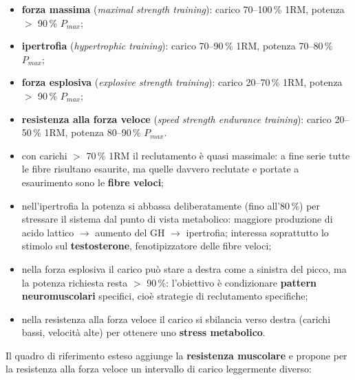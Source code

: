 \begin{itemize}
  \item \textbf{forza massima} (\textit{maximal strength training}): carico 70--100\,\% 1RM, potenza
    $>$ 90\,\% $P_{max}$;
  \item \textbf{ipertrofia} (\textit{hypertrophic training}): carico 70--90\,\% 1RM, potenza
    70--80\,\% $P_{max}$;
  \item \textbf{forza esplosiva} (\textit{explosive strength training}): carico 20--70\,\% 1RM,
    potenza $>$ 90\,\% $P_{max}$;
  \item \textbf{resistenza alla forza veloce} (\textit{speed strength endurance training}): carico
    20--50\,\% 1RM, potenza 80--90\,\% $P_{max}$.
\end{itemize}

\begin{itemize}
  \item con carichi $>$ 70\,\% 1RM il reclutamento è quasi massimale: a fine serie tutte le fibre
    risultano esaurite, ma quelle davvero reclutate e portate a esaurimento sono le \textbf{fibre
    veloci};
  \item nell'ipertrofia la potenza si abbassa deliberatamente (fino all'80\,\%) per stressare il
    sistema dal punto di vista metabolico: maggiore produzione di acido lattico $\rightarrow$
    aumento del GH $\rightarrow$ ipertrofia; interessa soprattutto lo stimolo sul
    \textbf{testosterone}, fenotipizzatore delle fibre veloci;
  \item nella forza esplosiva il carico può stare a destra come a sinistra del picco, ma la potenza
    richiesta resta $>$ 90\,\%: l'obiettivo è condizionare \textbf{pattern neuromuscolari}
    specifici, cioè strategie di reclutamento specifiche;
  \item nella resistenza alla forza veloce il carico si sbilancia verso destra (carichi bassi,
    velocità alte) per ottenere uno \textbf{stress metabolico}.
\end{itemize}

Il quadro di riferimento esteso aggiunge la \textbf{resistenza muscolare} e propone per la
resistenza alla forza veloce un intervallo di carico leggermente diverso:

